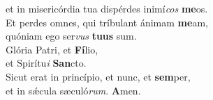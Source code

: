 \oddverse et in misericórdia tua dispérdes inimí\textit{cos} \textbf{me}os.\\
\evenverse Et perdes omnes, qui tríbulant ánimam \textbf{me}am,~\*\\
\evenverse quóniam ego ser\textit{vus} \textbf{tu}\textbf{us} sum.\\
\oddverse Glória Patri, et \textbf{Fí}lio,~\*\\
\oddverse et Spirítu\textit{i} \textbf{San}cto.\\
\evenverse Sicut erat in princípio, et nunc, et \textbf{sem}per,~\*\\
\evenverse et in sǽcula sæculó\textit{rum}. \textbf{A}men.\\
